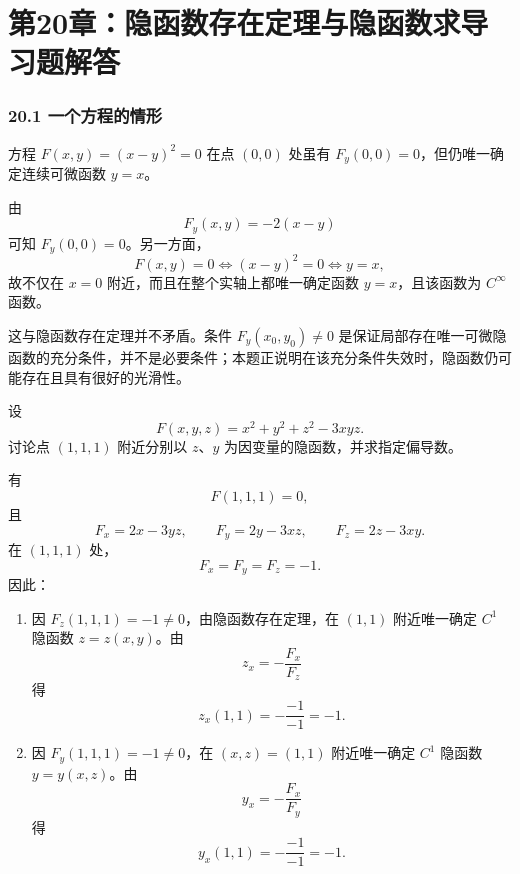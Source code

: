
\chapter*{第20章：隐函数存在定理与隐函数求导习题解答}
\subsection*{20.1 一个方程的情形}

\begin{xthought}[20.1.3 思考题 1]
方程 $F(x,y)=(x-y)^2=0$ 在点 $(0,0)$ 处虽有 $F_y(0,0)=0$，但仍唯一确定连续可微函数 $y=x$。
\end{xthought}
\begin{xsolution}
由
\[
  F_y(x,y)=-2(x-y)
\]
可知 $F_y(0,0)=0$。另一方面，
\[
  F(x,y)=0\iff (x-y)^2=0\iff y=x,
\]
故不仅在 $x=0$ 附近，而且在整个实轴上都唯一确定函数 $y=x$，且该函数为 $C^\infty$ 函数。

这与隐函数存在定理并不矛盾。条件 $F_y(x_0,y_0)\ne0$ 是保证局部存在唯一可微隐函数的充分条件，并不是必要条件；本题正说明在该充分条件失效时，隐函数仍可能存在且具有很好的光滑性。
\end{xsolution}

\begin{xthought}[20.1.3 思考题 2]
设
\[
  F(x,y,z)=x^2+y^2+z^2-3xyz.
\]
讨论点 $(1,1,1)$ 附近分别以 $z$、$y$ 为因变量的隐函数，并求指定偏导数。
\end{xthought}
\begin{xsolution}
有
\[
  F(1,1,1)=0,
\]
且
\[
  F_x=2x-3yz,\qquad F_y=2y-3xz,\qquad F_z=2z-3xy.
\]
在 $(1,1,1)$ 处，
\[
  F_x=F_y=F_z=-1.
\]
因此：
\begin{enumerate}[label=(\arabic*)]
  \item 因 $F_z(1,1,1)=-1\ne0$，由隐函数存在定理，在 $(1,1)$ 附近唯一确定 $C^1$ 隐函数 $z=z(x,y)$。由
  \[
    z_x=-\frac{F_x}{F_z}
  \]
  得
  \[
    z_x(1,1)=-\frac{-1}{-1}=-1.
  \]
  \item 因 $F_y(1,1,1)=-1\ne0$，在 $(x,z)=(1,1)$ 附近唯一确定 $C^1$ 隐函数 $y=y(x,z)$。由
  \[
    y_x=-\frac{F_x}{F_y}
  \]
  得
  \[
    y_x(1,1)=-\frac{-1}{-1}=-1.
  \]
\end{enumerate}
\end{xsolution}

